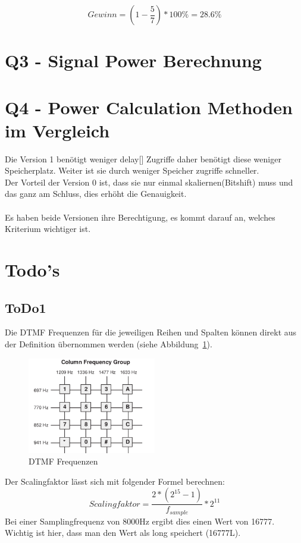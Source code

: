 \documentclass[a4paper,11pt]{article}
\begin{document}
\begin{equation}\label{eq:v0 vs. v1}
	Gewinn = (1-\frac{5}{7})*100\% = 28.6\%
\end{equation}

\section{Q3 - Signal Power Berechnung}

\section{Q4 - Power Calculation Methoden im Vergleich}

Die Version 1 benötigt weniger delay[] Zugriffe daher benötigt diese weniger Speicherplatz. Weiter ist sie durch weniger Speicher zugriffe schneller. \\
Der Vorteil der Version 0 ist, dass sie nur einmal skaliernen(Bitshift) muss und das ganz am Schluss, dies erhöht die Genauigkeit.
\\\\
Es haben beide Versionen ihre Berechtigung, es kommt darauf an, welches Kriterium wichtiger ist.

\section{Todo's}
\subsection{ToDo1}
Die DTMF Frequenzen für die jeweiligen Reihen und Spalten können direkt aus der Definition übernommen werden (siehe Abbildung~\ref{fig:DTMF_freq}).
\begin{figure}[h!]
\centering
\includegraphics[width=0.5\textwidth]{DTMF_freq}
\caption{DTMF Frequenzen}
\label{fig:DTMF_freq}
\end{figure}
\newline
Der Scalingfaktor lässt sich mit folgender Formel berechnen:
\begin{equation}\label{eq:Scalingfakt}
	Scalingfaktor = \frac{2*(2^{15}-1)}{f_{sample}}*2^{11}
\end{equation}
Bei einer Samplingfrequenz von 8000Hz ergibt dies einen Wert von 16777. Wichtig ist hier, dass man den Wert als long speichert (16777L). 
\end{document}
